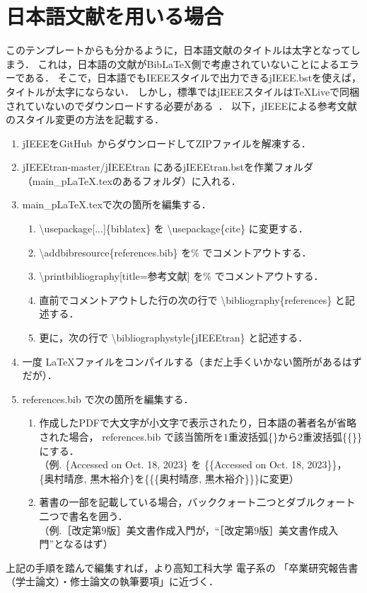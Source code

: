 \chapter{日本語文献を用いる場合}
このテンプレートからも分かるように，日本語文献のタイトルは太字となってしまう．
これは，日本語の文献がBib{\LaTeX}側で考慮されていないことによるエラーである．
そこで，日本語でもIEEEスタイルで出力できるjIEEE.bstを使えば，タイトルが太字にならない．
しかし，標準ではjIEEEスタイルは\TeX Liveで同梱されていないのでダウンロードする必要がある~\cite{jieeetran}．
以下，jIEEEによる参考文献のスタイル変更の方法を記載する．

\begin{enumerate}
    \item jIEEEをGitHub~\cite{jieeetran}からダウンロードしてZIPファイルを解凍する．
    \item jIEEEtran-master/jIEEEtran にあるjIEEEtran.bstを作業フォルダ（main\_pLaTeX.texのあるフォルダ）に入れる．
    \item main\_pLaTeX.texで次の箇所を編集する．
        \begin{enumerate}
            \item \textbackslash usepackage[...]\{biblatex\} を \textbackslash usepackage\{cite\} に変更する．
            \item \textbackslash addbibresource\{references.bib\} を\% でコメントアウトする．
            \item \textbackslash printbibliography[title={参考文献}] を\% でコメントアウトする．
            \item 直前でコメントアウトした行の次の行で \textbackslash bibliography\{references\} と記述する．
            \item 更に，次の行で \textbackslash bibliographystyle\{jIEEEtran\} と記述する．
        \end{enumerate}
    \item 一度 \LaTeX ファイルをコンパイルする（まだ上手くいかない箇所があるはずだが）．
    \item references.bib で次の箇所を編集する．
        \begin{enumerate}
            \item 作成したPDFで大文字が小文字で表示されたり，日本語の著者名が省略された場合，
                references.bib で該当箇所を$1$重波括弧\{\}から$2$重波括弧\{\{\}\}にする．\\
                （例. \{Accessed on Oct. 18, 2023\} を \{\{Accessed on Oct. 18, 2023\}\}，\\
                    \{奥村晴彦, 黒木裕介\}を\{\{\{奥村晴彦, 黒木裕介\}\}\}に変更）
            \item 著書の一部を記載している場合，バッククォート二つとダブルクォート二つで書名を囲う．\\
                （例.［改定第$9$版］\LaTeXe 美文書作成入門が，``［改定第$9$版］\LaTeXe 美文書作成入門''となるはず）
        \end{enumerate}
\end{enumerate}

上記の手順を踏んで編集すれば，より高知工科大学 電子系の
「卒業研究報告書（学士論文）・修士論文の執筆要項」に近づく．